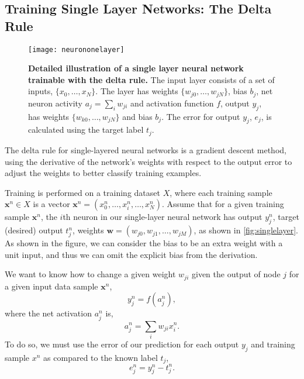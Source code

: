 \documentclass[thesis]{subfiles}
\begin{document}
\subsection{Training Single Layer Networks: The Delta Rule}
\label{deltarule}
\begin{figure}[tbp]
\centering
\texttt{[image: neurononelayer]}
\caption[Detailed illustration of a single layer neural network]{\textbf{Detailed illustration of a single layer neural network trainable with the delta rule.} The input layer consists of a set of inputs, $\{x_{0}, \ldots, x_{N}\}$. The layer has weights $\{w_{j0}, \ldots, w_{jN}\}$, bias $b_j$, net neuron activity $a_j = \sum_i w_{ji}$ and activation function $f$, output $y_j$, has weights $\{w_{k0}, \ldots, w_{jN}\}$ and bias $b_j$. The error for output $y_j$, $e_j$, is calculated using the target label $t_j$.}
\label{fig:neurononelayer}
\end{figure}

The delta rule for single-layered neural networks is a gradient descent method, using the derivative of the network's weights with respect to the output error to adjust the weights to better classify training examples.

Training is performed on a training dataset $X$, where each training sample $\mathbf{x}^n\in X$ is a vector $\mathbf{x}^n = (x^n_0, \ldots, x^n_i, \ldots, x^n_N)$. Assume that for a given training sample $\mathbf{x}^n$, the $i$th neuron in our single-layer neural network has output $y^n_j$, target (desired) output $t^n_j$, weights $\mathbf{w}=(w_{j0}, w_{j1}, \ldots, w_{jM})$, as shown in \cref{fig:singlelayer}. As shown in the figure, we can consider the bias to be an extra weight with a unit input, and thus we can omit the explicit bias from the derivation. 

We want to know how to change a given weight $w_{ji}$ given the output of node $j$ for a given input data sample $\mathbf{x}^n$, 
\begin{equation}
	y^n_j = f\left( a^n_j \right),
	\label{eqn:output}
\end{equation}
where the net activation $a^n_j$ is,
\begin{equation}
	a^n_j = \sum_i w_{ji} x^n_{i}.
	\label{eqn:weightsum}
\end{equation}
To do so, we must use the error of our prediction for each output $y_j$ and training sample $x^n$ as compared to the known label $t_j$,
\begin{equation}
    e^n_j = y^n_j - t^n_j.
    \label{eqn:error}
\end{equation}
\end{document}

